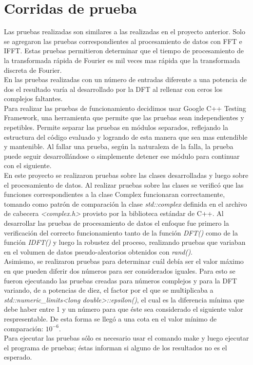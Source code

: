 \documentclass[12pt,a4paper]{report}
\begin{document}
	\section{Corridas de prueba}
	 
		\indent Las pruebas realizadas son similares a las realizadas en el proyecto anterior. Solo se agregaron las pruebas 
		correspondientes al procesamiento de datos con FFT e IFFT. Estas pruebas permitieron determinar que el tiempo de 
		procesamiento de la transformada rápida de Fourier es mil veces mas rápida que la transformada discreta de Fourier. 
		\\
		\indent En las pruebas realizadas con un número de entradas diferente a una potencia de dos el resultado varía al 
		desarrollado por la DFT al rellenar con ceros los complejos faltantes.
		\\	
		\indent Para realizar las pruebas de funcionamiento decidimos usar Google C++ Testing Framework, una herramienta que 
		permite que las pruebas sean independientes y repetibles. Permite separar las pruebas en módulos separados, reflejando 
		la estructura del código evaluado y logrando de esta manera que sea mas entendible y mantenible. Al fallar una prueba, 
		según la naturaleza de la falla, la prueba puede seguir desarrollándose o simplemente detener ese módulo para continuar 
		con el siguiente. 	
		\\
		\indent En este proyecto se realizaron pruebas sobre las clases desarrolladas y luego sobre el procesamiento de datos.
		Al realizar pruebas sobre las clases se verificó que las funciones correspondientes a la clase Complex funcionaran 
		correctamente, tomando como patrón de comparación la clase \textit{std::complex} definida en el archivo de cabecera
		\textit{<complex.h>} provisto por la biblioteca estándar de C++. Al desarrollar las pruebas de procesamiento de datos 
		el enfoque fue primero la verificación del correcto funcionamiento tanto de la función \textit{DFT()} como de la 
		función \textit{IDFT()} y luego la robustez del proceso, realizando pruebas que variaban en el volumen de datos 
		pseudo-aleatorios obtenidos con \textit{rand()}.
		\\
		\indent Asimismo, se realizaron pruebas para determinar cuál debía ser el valor máximo en que pueden diferir dos números
		para ser considerados iguales. Para esto se fueron ejecutando las pruebas creadas para números complejos y para la DFT variando,
		de a potencias de diez, el factor por el que se multiplicaba a \textit{std::numeric\_limits<long double>::epsilon()}, el cual es
		la diferencia mínima que debe	haber	entre 1 y un número para que éste sea considerado el siguiente valor respresentable. 
		De esta forma se llegó a una cota en el valor mínimo de comparación: $10^{-6}$.
		\\
		\indent Para ejecutar las pruebas sólo es necesario usar el comando make y luego ejecutar el programa de pruebas;
		éstas informan si alguno de los resultados no es el esperado.
\end{document}
